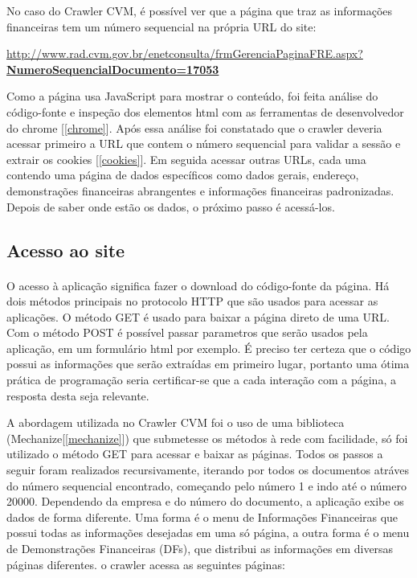 \documentclass[a4paper, 12pt]{article}
\begin{document}
No caso do Crawler CVM, é possível ver que a página que
traz as informações financeiras tem um número sequencial na própria
URL do site:

\href{http://www.rad.cvm.gov.br/enetconsulta/frmGerenciaPaginaFRE.aspx?NumeroSequencialDocumento=17053}
{{\scriptsize
    http://www.rad.cvm.gov.br/enetconsulta/frmGerenciaPaginaFRE.aspx? {\bf NumeroSequencialDocumento=17053}}}

Como a página usa JavaScript para mostrar o conteúdo, foi
feita análise do código-fonte e inspeção dos elementos html com as
ferramentas de desenvolvedor do chrome [\ref{chrome}]. Após essa
análise foi constatado que o crawler deveria acessar primeiro a URL
que contem o número sequencial para validar a sessão e extrair os
cookies [\ref{cookies}]. Em seguida acessar outras URLs, cada uma
contendo uma página de dados específicos como dados gerais, endereço,
demonstrações financeiras abrangentes e informações financeiras
padronizadas. Depois de saber onde estão os dados, o próximo passo é
acessá-los.

\subsection{Acesso ao site}\label{acesso}
\paragraph{}O acesso à aplicação significa fazer o download do
código-fonte da página. Há dois métodos principais no protocolo
HTTP que são usados para acessar as aplicações. O método GET é usado
para baixar a página direto de uma URL. Com o método POST é possível
passar parametros que serão usados pela aplicação, em um formulário
html por exemplo. É preciso ter certeza que o código possui as
informações que serão extraídas em primeiro lugar, portanto uma ótima
prática de programação seria certificar-se que a cada interação com a
página, a resposta desta seja relevante.

A abordagem utilizada no Crawler CVM foi o uso de uma
biblioteca (Mechanize[\ref{mechanize}]) que submetesse os métodos à
rede com facilidade, só foi utilizado o método GET para acessar e
baixar as páginas. Todos os passos a seguir foram realizados
recursivamente, iterando por todos os documentos atráves do número
sequencial encontrado, começando pelo número 1 e indo até o número
20000. Dependendo da empresa e do número do documento, a aplicação
exibe os dados de forma diferente. Uma forma é o menu de Informações
Financeiras que possui todas as informações desejadas em uma só
página, a outra forma é o menu de Demonstrações Financeiras (DFs), que
distribui as informações em diversas páginas diferentes.
o crawler acessa as seguintes páginas:
\end{document}
